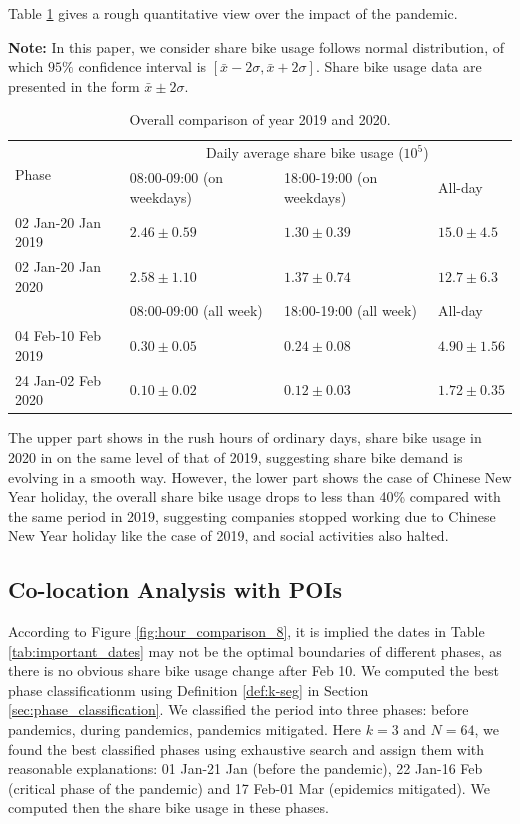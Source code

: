\documentclass[preprints,article,accept,moreauthors,pdftex]{Definitions/mdpi}
\begin{document}
Table \ref{tab:overall_comparison} gives a rough quantitative view over the impact of the pandemic.

\textbf{Note:} In this paper, we consider share bike usage follows normal distribution, of which $95\%$ confidence interval is $[\bar{x}-2\sigma,\bar{x}+2\sigma]$.
Share bike usage data are presented in the form $\bar{x}\pm2\sigma$.

\begin{table}[ht]
    \centering
    \begin{tabular}{|l|l|l|l|}
        \hline
        \multirow{2}{*}{Phase} &\multicolumn{3}{c|}{Daily average share bike usage ($10^{5}$)}\\
        \cline{2-4}
        & 08:00-09:00 (on weekdays) & 18:00-19:00 (on weekdays) & All-day\\
        \hline
        02 Jan-20 Jan 2019 & $2.46\pm0.59$ & $1.30\pm0.39$ & $15.0\pm4.5$\\
        \hline
        02 Jan-20 Jan 2020 & $2.58\pm1.10$ & $1.37\pm0.74$ & $12.7\pm6.3$\\
        \hline
        \hline
        & 08:00-09:00 (all week)  & 18:00-19:00 (all week) & All-day\\
        \hline
        04 Feb-10 Feb 2019 & $0.30\pm0.05$ & $0.24\pm0.08$ & $4.90\pm1.56$\\
        \hline
        24 Jan-02 Feb 2020 & $0.10\pm0.02$ & $0.12\pm0.03$ & $1.72\pm0.35$\\
        \hline
    \end{tabular}
    \caption{Overall comparison of year 2019 and 2020.}\label{tab:overall_comparison}
\end{table}

The upper part shows in the rush hours of ordinary days, share bike usage in 2020 in on the same level of that of 2019, suggesting share bike demand is evolving in a smooth way.
However, the lower part shows the case of Chinese New Year holiday, the overall share bike usage drops to less than 40\% compared with the same period in 2019, suggesting companies stopped working due to Chinese New Year holiday like the case of 2019, and social activities also halted. 

\subsection{Co-location Analysis with POIs}\label{sec:colo-poi}

According to Figure \ref{fig:hour_comparison_8}, it is implied the dates in Table \ref{tab:important_dates} may not be the optimal boundaries of different phases, as there is no obvious share bike usage change after Feb 10.
We computed the best phase classificationm using Definition \ref{def:k-seg} in Section \ref{sec:phase_classification}.
We classified the period into three phases: before pandemics, during pandemics, pandemics mitigated.
Here $k=3$ and $N=64$, we found the best classified phases using exhaustive search and assign them with reasonable explanations: 01 Jan-21 Jan (before the pandemic), 22 Jan-16 Feb (critical phase of the pandemic) and 17 Feb-01 Mar (epidemics mitigated).
We computed then the share bike usage in these phases.
\end{document}
